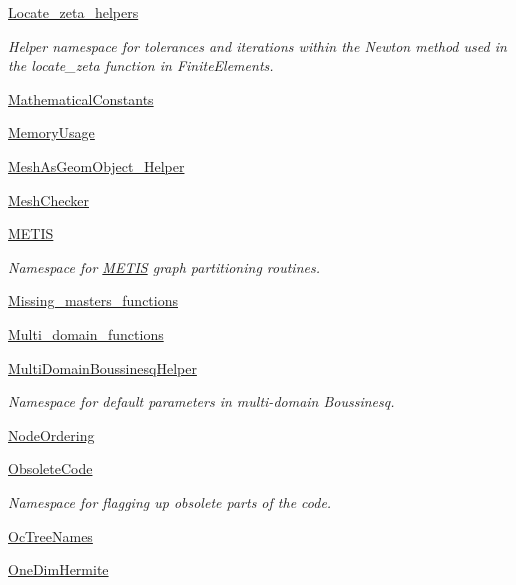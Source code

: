 \begin{DoxyCompactItemize}
\item 
 \hyperlink{namespaceoomph_1_1Locate__zeta__helpers}{Locate\+\_\+zeta\+\_\+helpers}
\begin{DoxyCompactList}\small\item\em Helper namespace for tolerances and iterations within the Newton method used in the locate\+\_\+zeta function in Finite\+Elements. \end{DoxyCompactList}\item 
 \hyperlink{namespaceoomph_1_1MathematicalConstants}{Mathematical\+Constants}
\item 
 \hyperlink{namespaceoomph_1_1MemoryUsage}{Memory\+Usage}
\item 
 \hyperlink{namespaceoomph_1_1MeshAsGeomObject__Helper}{Mesh\+As\+Geom\+Object\+\_\+\+Helper}
\item 
 \hyperlink{namespaceoomph_1_1MeshChecker}{Mesh\+Checker}
\item 
 \hyperlink{namespaceoomph_1_1METIS}{M\+E\+T\+IS}
\begin{DoxyCompactList}\small\item\em Namespace for \hyperlink{namespaceoomph_1_1METIS}{M\+E\+T\+IS} graph partitioning routines. \end{DoxyCompactList}\item 
 \hyperlink{namespaceoomph_1_1Missing__masters__functions}{Missing\+\_\+masters\+\_\+functions}
\item 
 \hyperlink{namespaceoomph_1_1Multi__domain__functions}{Multi\+\_\+domain\+\_\+functions}
\item 
 \hyperlink{namespaceoomph_1_1MultiDomainBoussinesqHelper}{Multi\+Domain\+Boussinesq\+Helper}
\begin{DoxyCompactList}\small\item\em Namespace for default parameters in multi-\/domain Boussinesq. \end{DoxyCompactList}\item 
 \hyperlink{namespaceoomph_1_1NodeOrdering}{Node\+Ordering}
\item 
 \hyperlink{namespaceoomph_1_1ObsoleteCode}{Obsolete\+Code}
\begin{DoxyCompactList}\small\item\em Namespace for flagging up obsolete parts of the code. \end{DoxyCompactList}\item 
 \hyperlink{namespaceoomph_1_1OcTreeNames}{Oc\+Tree\+Names}
\item 
 \hyperlink{namespaceoomph_1_1OneDimHermite}{One\+Dim\+Hermite}

\end{DoxyCompactItemize}
